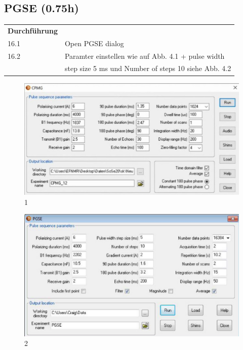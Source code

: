 \subsection{PGSE (0.75h)}


\begin{tabular}{ll}
    \textbf{Durchführung} & \\

    16.1 & Open PGSE dialog \\

    16.2 & Paramter einstellen wie auf Abb. 4.1 + pulse width  \\

         & step size 5 ms und Number of steps 10 siehe Abb. 4.2 \\

\end{tabular}  

\begin{figure}[H]
\includegraphics[width = \textwidth]{1.png}
\caption{1}
\label{1}
\end{figure}

\begin{figure}[H]
    \includegraphics[width = \textwidth]{2.png}
    \caption{2}
    \label{2}
    \end{figure}

